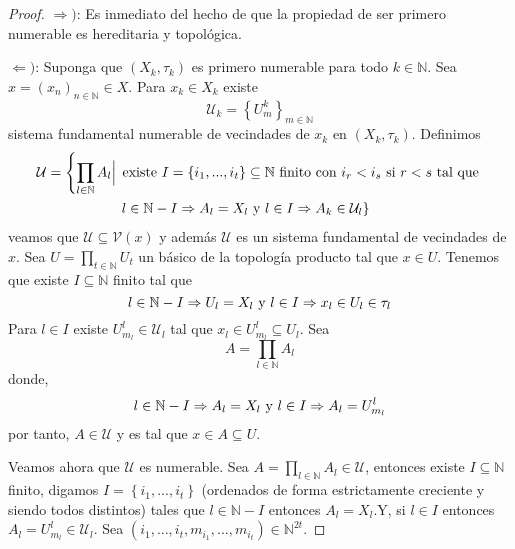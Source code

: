 \documentclass[12pt]{report}
\theoremstyle{largebreak}
\begin{document}
    \begin{proof}
        $\Rightarrow)$: Es inmediato del hecho de que la propiedad de ser primero numerable es hereditaria y topológica.

        $\Leftarrow)$: Suponga que $(X_k,\tau_k)$ es primero numerable para todo $k\in\mathbb{N}$. Sea $x=(x_n)_{n\in\mathbb{N}}\in X$. Para $x_k\in X_k$ existe
        \begin{equation*}
            \mathcal{U}_k=\left\{U_m^k \right\}_{ m\in\mathbb{N}}
        \end{equation*}
        sistema fundamental numerable de vecindades de $x_k$ en $(X_k,\tau_k)$. Definimos
        \begin{equation*}
            \begin{split}
                \mathcal{U}=\left\{\prod_{ l\in\mathbb{N}}A_l\Big|\right.&\textup{ existe }I=\left\{i_1,...,i_t \right\} \subseteq\mathbb{N}\textup{ finito con }i_r<i_s\textup{ si }r<s\textup{ tal que } \\
                &\left.l\in\mathbb{N}-I\Rightarrow A_l=X_l\textup{ y }l\in I\Rightarrow A_k\in\mathcal{U}_l \right\}\\
            \end{split}
        \end{equation*}
        veamos que $\mathcal{U}\subseteq\mathcal{V}(x)$ y además $\mathcal{U}$  es un sistema fundamental de vecindades de $x$. Sea $U=\prod_{t\in\mathbb{N}}U_t$ un básico de la topología producto tal que $x\in U$. Tenemos que existe $I\subseteq\mathbb{N}$ finito tal que
        \begin{equation*}
            l\in\mathbb{N}-I\Rightarrow U_l=X_l\textup{ y }l\in I\Rightarrow x_l\in U_l\in\tau_l
        \end{equation*}
        Para $l\in I$ existe $U_{ m_l}^l\in\mathcal{U}_l$ tal que $x_l\in U_{ m_l}^l\subseteq U_l$. Sea
        \begin{equation*}
            A=\prod_{ l\in\mathbb{N}}A_l
        \end{equation*}
        donde,
        \begin{equation*}
            l\in\mathbb{N}-I\Rightarrow A_l=X_l\textup{ y }l\in I\Rightarrow A_l=U_{ m_l}^l
        \end{equation*}
        por tanto, $A\in\mathcal{U}$ y es tal que $x\in A\subseteq U$. 
        
        Veamos ahora que $\mathcal{U}$ es numerable. Sea $A=\prod_{ l\in\mathbb{N}}A_l\in\mathcal{U}$, entonces existe $I\subseteq\mathbb{N}$ finito, digamos $I=\left\{i_1,...,i_t \right\}$ (ordenados de forma estrictamente creciente y siendo todos distintos) tales que $l\in\mathbb{N}-I$ entonces $A_l=X_l$.Y, si $l\in I$ entonces $A_l=U_{ m_l}^l\in\mathcal{U}_l$. Sea $(i_1,...,i_t,m_{i_1},...,m_{i_t})\in\mathbb{N}^{ 2t}$. 
        

\end{proof}
\end{document}
